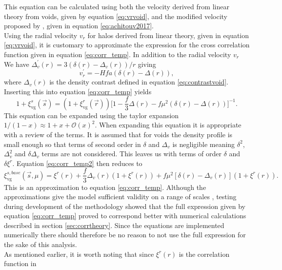 This equation can be calculated using both the velocity derived from linear theory from voids, given by equation \ref{eq:vrvoid}, and the modified velocity proposed by \cite{Achitouv_streaming}, given in equation \ref{eq:achitouv2017}.
\\\indent
Using the radial velocity $v_r$ for halos derived from linear theory, given in equation \ref{eq:vrvoid}, it is customary to approximate the expression for the cross correlation function given in equation \ref{eq:corr_temp}. In addition to the radial velocity $v_r$ We have $\Delta_v^\prime(r)=3(\delta(r)-\Delta_v(r))/r$ giving
\begin{equation}
    v_r^\prime=-Hfa(\delta(r)-\Delta(r)),
\end{equation}
where $\Delta_v(r)$ is the density contrast defined in equation
\ref{eq:contrastvoid}. Inserting this into equation \ref{eq:corr_temp} yields
\begin{equation}\label{eq:corr_temp2}
    1 + \xi^s_{\mathrm{vg}}(\vec{s})=(1 + \xi^r_{\mathrm{vg}}(\vec{r})) \Big[1 -\frac{f}{3}\Delta(r)-f\mu^2(\delta(r)-\Delta(r))\Big]^{-1}.
\end{equation}
This equation can be expanded using the taylor expansion
$1/(1-x)\approx1+x+\mathcal{O}(x)^2$. When expanding this equation it is
appropriate with a review of the terms. It is
assumed that for voids the density profile is small enough so that terms of
second order in $\delta$ and $\Delta_{v}$ is negligible meaning $\delta^2$,
$\Delta_{v}^2$ and $\delta\Delta_v$ terms are not considered. This leaves us with terms
of order $\delta$ and  $\delta\xi^r$. Equation
\ref{eq:corr_temp2} then reduces to
\begin{equation}\label{eq:corr_no_stream}
    \xi^{s,base}_{\mathrm{vg}}(\vec{s},\mu)=\xi^r(r)+\frac{f}{3}\Delta_v(r)(1+\xi^r(r))+f\mu^2[\delta(r)-\Delta_v(r)](1+\xi^r(r)).
\end{equation}
This is an approximation to equation \ref{eq:corr_temp}. Although the approximations give
the model sufficient validity on a range of scales \cite{BeyondBAO}, testing during development of the methodology showed that the full expression given by equation \ref{eq:corr_temp} proved to correspond better with numerical calculations described in section \ref{sec:corrtheory}. Since the equations are implemented numerically there should therefore be no reason to not use the full expression for the sake of this analysis.\\\indent
As mentioned earlier, it is worth noting that since $\xi^r(r)$ is the correlation function in
